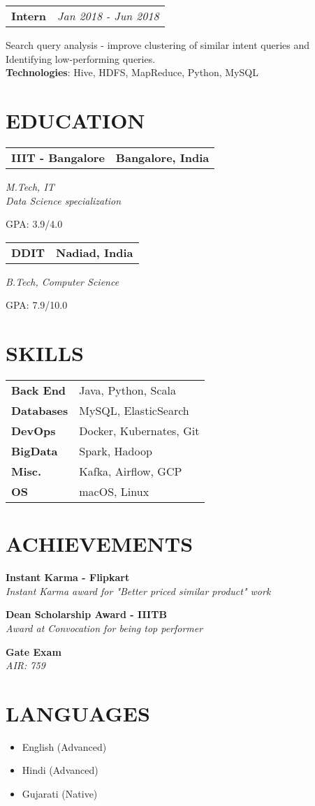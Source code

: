 \documentclass[11pt,a4paper]{moderncv}
\newcommand*{\subexperienceentry}[2]{
    \begin{tabularx}{\textwidth}{LR}
        \textbf{#1} & {\itshape #2}
    \end{tabularx}
}
\newcommand*{\educationentry}[4][0.5mm]{
    \begin{tabularx}{\textwidth}{LR}
        {\bfseries #3} & {\bfseries #4} \\
    \end{tabularx}
    {\itshape #2}
    \par\addvspace{#1}
}
\newcommand*{\scoreentry}[3][2.5mm]{
    {\bfseries #2} \\
    {\itshape #3}
    \par\addvspace{#1}
}
\begin{document}
\begin{minipage}[t]{0.62\textwidth}
\subexperienceentry{Intern}{Jan 2018 - Jun 2018}
Search query analysis - improve clustering of similar intent queries and Identifying low-performing queries. \\
\textbf {Technologies}: Hive, HDFS, MapReduce, Python, MySQL
\vspace{3.0mm}


\end{minipage}
\hfill
\begin{minipage}[t]{0.35\textwidth}

\section{EDUCATION}
\educationentry{M.Tech, IT\\Data Science specialization}{IIIT - Bangalore}{Bangalore, India}
GPA: 3.9/4.0
\par
\vspace{3.0mm}
\educationentry{B.Tech, Computer Science}{DDIT}{Nadiad, India}
GPA: 7.9/10.0

\section{SKILLS}
\begin{tabularx}{\textwidth}{>{\bfseries}l@{\hskip 3.5mm}L}
Back End & Java, Python, Scala \\
Databases & MySQL, ElasticSearch \\
DevOps & Docker, Kubernates, Git \\
BigData & Spark, Hadoop \\
Misc. & Kafka, Airflow, GCP \\
OS & macOS, Linux \\
\end{tabularx}


\section{ACHIEVEMENTS}
\scoreentry{Instant Karma - Flipkart}{Instant Karma award for "Better priced similar product" work}
\scoreentry{Dean Scholarship Award - IIITB}{Award at Convocation for being top performer}
\scoreentry{Gate Exam}{AIR: 759}


\section{LANGUAGES}
\begin{itemize}
    \item English (Advanced)
    \item Hindi (Advanced)
    \item Gujarati (Native)
\end{itemize}


\end{minipage}
\end{document}
